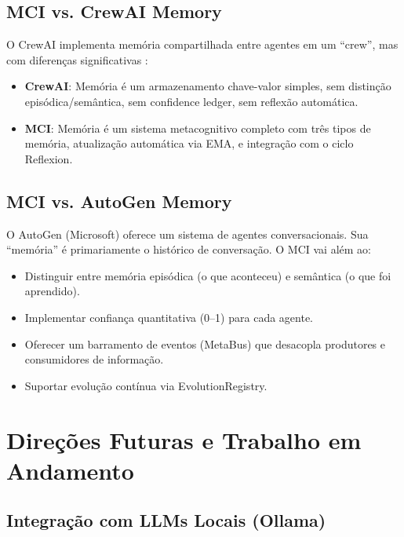 \subsection{MCI vs. CrewAI Memory}

O CrewAI implementa memória compartilhada entre agentes em um ``crew'', mas com diferenças significativas \cite{Shinn2023_Reflexion}:

\begin{itemize}
    \item \textbf{CrewAI}: Memória é um armazenamento chave-valor simples, sem distinção episódica/semântica, sem confidence ledger, sem reflexão automática.
    \item \textbf{MCI}: Memória é um sistema metacognitivo completo com três tipos de memória, atualização automática via EMA, e integração com o ciclo Reflexion.
\end{itemize}

\subsection{MCI vs. AutoGen Memory}

O AutoGen (Microsoft) \cite{Yao2023_ReAct} oferece um sistema de agentes conversacionais. Sua ``memória'' é primariamente o histórico de conversação. O MCI vai além ao:

\begin{itemize}
    \item Distinguir entre memória episódica (o que aconteceu) e semântica (o que foi aprendido).
    \item Implementar confiança quantitativa (0--1) para cada agente.
    \item Oferecer um barramento de eventos (MetaBus) que desacopla produtores e consumidores de informação.
    \item Suportar evolução contínua via EvolutionRegistry.
\end{itemize}

\section{Direções Futuras e Trabalho em Andamento}
\label{sec:future}

\subsection{Integração com LLMs Locais (Ollama)}

